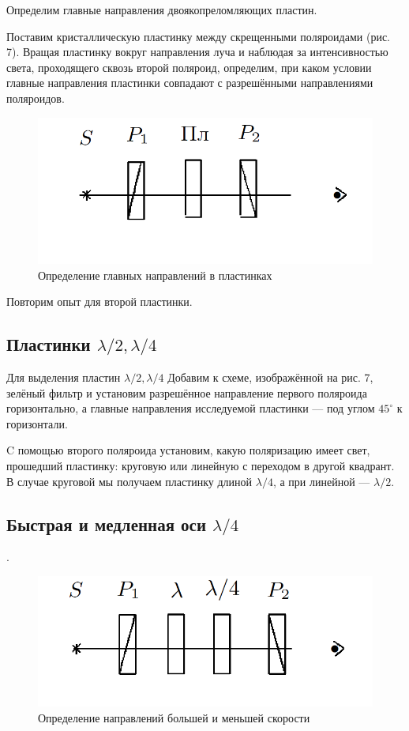 \documentclass[12pt]{kiarticle}
\begin{document}
Определим главные направления двоякопреломляющих пластин. 

Поставим кристаллическую пластинку между скрещенными поляроидами (рис. 7). Вращая пластинку вокруг направления луча и наблюдая за интенсивностью света, проходящего сквозь второй поляроид, определим, при каком условии главные направления пластинки совпадают с разрешёнными направлениями поляроидов. 

\begin{figure}
	\includegraphics[width=\linewidth]{7}
	\caption{Определение главных
		направлений в пластинках}
	\label{ris 7}
\end{figure}

Повторим опыт для второй пластинки.

\subsection{Пластинки $ \lambda/2, \lambda/4 $}

Для выделения пластин $ \lambda/2, \lambda/4 $ Добавим к схеме, изображённой на рис. 7, зелёный фильтр и установим разрешённое направление первого поляроида горизонтально, а главные направления исследуемой пластинки --- под углом $ 45^\circ $ к горизонтали.

C помощью второго поляроида установим, какую поляризацию
имеет свет, прошедший пластинку: круговую или линейную с переходом
в другой квадрант. В случае круговой мы получаем пластинку длиной $ \lambda/4 $, а при линейной --- $ \lambda/2 $.

\subsection{Быстрая и медленная оси $ \lambda/4 $}.

\begin{figure}
	\includegraphics[width=\linewidth]{8}
	\caption{Определение направлений
большей и меньшей скорости}
	\label{ris 8}
\end{figure}
\end{document}
